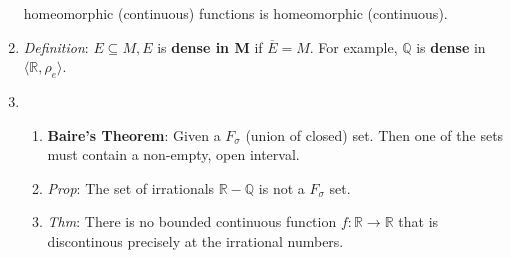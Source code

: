 \documentclass[10pt]{article}
\newcommand{\real}{\mathbb{R}}
\begin{document}
\begin{multicols*}{3}
\begin{enumerate}
			homeomorphic (continuous) functions is homeomorphic (continuous).
		\item \emph{Definition}: $E\subseteq M, E$ is \textbf{dense in M} if
			$\overline{E}=M$. For example, $\mathbb{Q}$ is \textbf{dense} in
			$\langle\real,\rho_{e}\rangle$.
		\item
			\begin{enumerate}
				\item \textbf{Baire's Theorem}: Given a $F_{\sigma}$ (union of closed)
					set. Then one of the sets must contain a non-empty, open interval.
				\item \emph{Prop}: The set of irrationals $\real-\mathbb{Q}$ is not a
					$F_{\sigma}$ set.
				\item \emph{Thm}: There is no bounded continuous function
					$f:\real\to\real$ that is discontinous precisely at the irrational
					numbers.
			\end{enumerate}
	\end{enumerate}



\end{multicols*}
\end{document}
